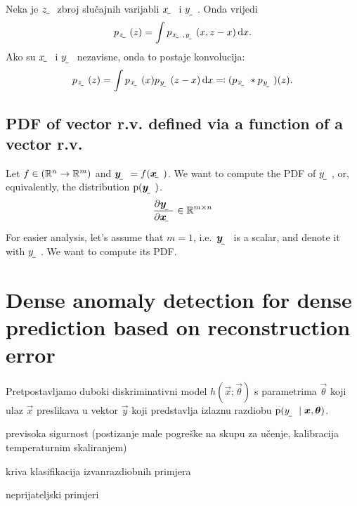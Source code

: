 \documentclass[oneside]{book}
\begin{document}
Neka je $\rvar z$ zbroj slučajnih varijabli $\rvar x$ i $\rvar y$. Onda vrijedi
\begin{align}
	p_{\rvar z}(z) = \int p_{\rvar x,\rvar y}(x, z-x)\dif x \text{.}
\end{align}
Ako su $\rvar x$ i $\rvar y$ nezavisne, onda to postaje konvolucija:
\begin{align} \label{eq:nezavisne-gustoce-konvolucija}
p_{\rvar z}(z) = \int p_{\rvar x}(x)p_{\rvar y}(z-x)\dif x \eqqcolon (p_{\rvar x}*p_{\rvar y})(z) \text{.}
\end{align}

\subsection{PDF of vector r.v. defined via a function of a vector r.v.}

Let $f \in (\mathbb{R}^n\to\mathbb{R}^m)$ and $\rvec y = f(\rvec x)$. We want to compute the PDF of $\rvar y$, or, equivalently, the distribution $\p(\rvec y)$.
\begin{align}
    \pd{\rvec y}{\rvec x} \in \R^{m\times n}
\end{align}

For easier analysis, let's assume that $m=1$, i.e.\ $\rvec y$ is a scalar, and denote it with $\rvar y$. We want to compute its PDF.


\section{Dense anomaly detection for dense prediction based on reconstruction error}

Pretpostavljamo duboki diskriminativni model $h(\vec x;\vec\theta)$ s parametrima $\vec\theta$ koji ulaz $\vec x$ preslikava u vektor $\vec y$ koji predstavlja izlaznu razdiobu  $\p(\rvar y\mid \vec x, \vec\theta)$.

previsoka sigurnost (postizanje male pogreške na skupu za učenje, kalibracija temperaturnim skaliranjem)

kriva klasifikacija izvanrazdiobnih primjera

neprijateljski primjeri

\citep{Hendrycks:2016:BDMOODE}

\citep{Guo:2017:CMNN}

\citep{Lee:2017:TCCCDOOD}

\citep{Liang:2017:PDOODENN}
\end{document}
